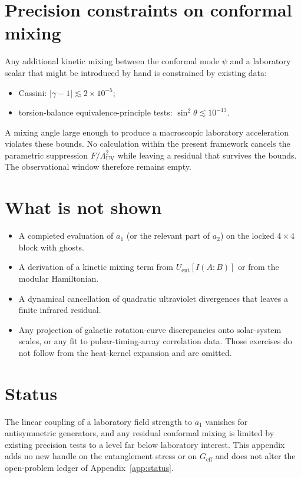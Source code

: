 \section{Precision constraints on conformal mixing}
\label{sec:constraints}

Any additional kinetic mixing between the conformal mode \(\psi\) and
a laboratory scalar that might be introduced by hand is constrained
by existing data:
\begin{itemize}
  \item Cassini: \(|\gamma-1|\lesssim 2\times 10^{-5}\);
  \item torsion-balance equivalence-principle tests:
        \(\sin^2\theta\lesssim 10^{-13}\).
\end{itemize}
A mixing angle large enough to produce a macroscopic laboratory
acceleration violates these bounds. No calculation within the
present framework cancels the parametric suppression
\(F/\Lambda_{\mathrm{UV}}^2\) while leaving a residual that survives
the bounds. The observational window therefore remains empty.

\section{What is not shown}
\label{sec:not-shown}

\begin{itemize}
  \item A completed evaluation of \(a_1\) (or the relevant part of
        \(a_2\)) on the locked \(4\times 4\) block with ghosts.
  \item A derivation of a kinetic mixing term from
        \(U_{\mathrm{ent}}[I(A:B)]\) or from the modular Hamiltonian.
  \item A dynamical cancellation of quadratic ultraviolet divergences
        that leaves a finite infrared residual.
  \item Any projection of galactic rotation-curve discrepancies onto
        solar-system scales, or any fit to pulsar-timing-array
        correlation data. Those exercises do not follow from the
        heat-kernel expansion and are omitted.
\end{itemize}

\section{Status}
\label{sec:appK-status}

The linear coupling of a laboratory field strength to \(a_1\)
vanishes for antisymmetric generators, and any residual conformal
mixing is limited by existing precision tests to a level far below
laboratory interest. This appendix adds no new handle on the
entanglement stress or on \(G_{\mathrm{eff}}\) and does not alter
the open-problem ledger of Appendix~\ref{app:status}.